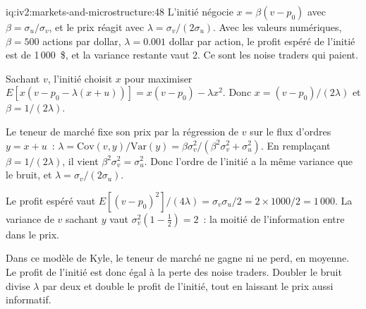 \begin{solution}{iq:iv2:markets-and-microstructure:48}
L'initié négocie $x = \beta(v - p_0)$ avec $\beta = \sigma_u/\sigma_v$, et le prix réagit avec $\lambda = \sigma_v/(2\sigma_u)$. Avec les valeurs numériques, $\beta = 500$ actions par dollar, $\lambda = 0.001$ dollar par action, le profit espéré de l'initié est de 1\,000~\$, et la variance restante vaut 2. Ce sont les noise traders qui paient.

Sachant $v$, l'initié choisit $x$ pour maximiser $E[x(v - p_0 - \lambda(x + u))] = x(v - p_0) - \lambda x^2$. Donc $x = (v - p_0)/(2\lambda)$ et $\beta = 1/(2\lambda)$.

Le teneur de marché fixe son prix par la régression de $v$ sur le flux d'ordres $y = x + u$~: $\lambda = \mathrm{Cov}(v, y)/\mathrm{Var}(y) = \beta\sigma_v^2/(\beta^2\sigma_v^2 + \sigma_u^2)$. En remplaçant $\beta = 1/(2\lambda)$, il vient $\beta^2\sigma_v^2 = \sigma_u^2$. Donc l'ordre de l'initié a la même variance que le bruit, et $\lambda = \sigma_v/(2\sigma_u)$.

Le profit espéré vaut $E[(v - p_0)^2]/(4\lambda) = \sigma_v\sigma_u/2 = 2 \times 1000/2 = 1\,000$. La variance de $v$ sachant $y$ vaut $\sigma_v^2(1 - \tfrac12) = 2$~: la moitié de l'information entre dans le prix.

Dans ce modèle de Kyle, le teneur de marché ne gagne ni ne perd, en moyenne. Le profit de l'initié est donc égal à la perte des noise traders. Doubler le bruit divise $\lambda$ par deux et double le profit de l'initié, tout en laissant le prix aussi informatif.

\end{solution}

